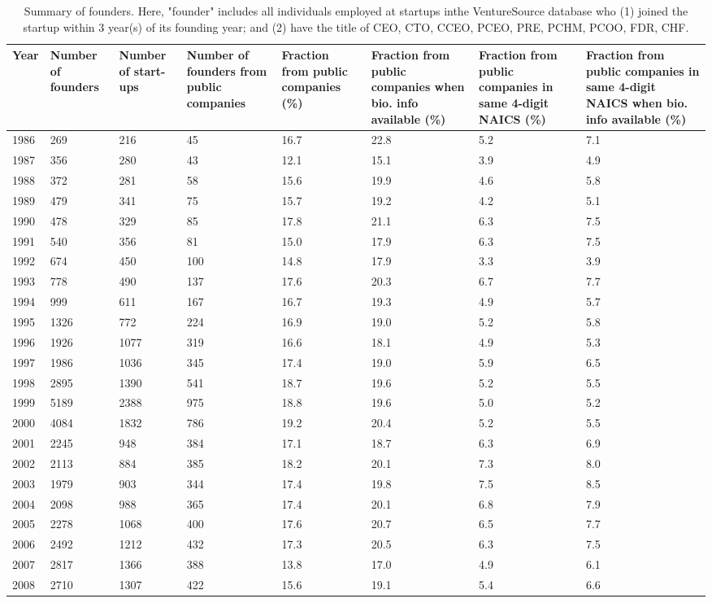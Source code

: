\begin{sidewaystable}[!htb]
\centering
\begingroup\tiny
\begin{tabular}{p{1.75cm}p{1.75cm}p{1.75cm}p{1.75cm}p{1.75cm}p{1.75cm}p{1.75cm}p{1.75cm}}
  \toprule
Year & Number of founders & Number of start-ups & Number of founders from public companies & Fraction from public companies (\%) & Fraction from public companies when bio. info available (\%) & Fraction from public companies in same 4-digit NAICS (\%) & Fraction from public companies in same 4-digit NAICS when bio. info available (\%) \\ 
  \midrule
1986 & 269 & 216 & 45 & 16.7 & 22.8 & 5.2 & 7.1 \\ 
  1987 & 356 & 280 & 43 & 12.1 & 15.1 & 3.9 & 4.9 \\ 
  1988 & 372 & 281 & 58 & 15.6 & 19.9 & 4.6 & 5.8 \\ 
  1989 & 479 & 341 & 75 & 15.7 & 19.2 & 4.2 & 5.1 \\ 
  1990 & 478 & 329 & 85 & 17.8 & 21.1 & 6.3 & 7.5 \\ 
  1991 & 540 & 356 & 81 & 15.0 & 17.9 & 6.3 & 7.5 \\ 
  1992 & 674 & 450 & 100 & 14.8 & 17.9 & 3.3 & 3.9 \\ 
  1993 & 778 & 490 & 137 & 17.6 & 20.3 & 6.7 & 7.7 \\ 
  1994 & 999 & 611 & 167 & 16.7 & 19.3 & 4.9 & 5.7 \\ 
  1995 & 1326 & 772 & 224 & 16.9 & 19.0 & 5.2 & 5.8 \\ 
  1996 & 1926 & 1077 & 319 & 16.6 & 18.1 & 4.9 & 5.3 \\ 
  1997 & 1986 & 1036 & 345 & 17.4 & 19.0 & 5.9 & 6.5 \\ 
  1998 & 2895 & 1390 & 541 & 18.7 & 19.6 & 5.2 & 5.5 \\ 
  1999 & 5189 & 2388 & 975 & 18.8 & 19.6 & 5.0 & 5.2 \\ 
  2000 & 4084 & 1832 & 786 & 19.2 & 20.4 & 5.2 & 5.5 \\ 
  2001 & 2245 & 948 & 384 & 17.1 & 18.7 & 6.3 & 6.9 \\ 
  2002 & 2113 & 884 & 385 & 18.2 & 20.1 & 7.3 & 8.0 \\ 
  2003 & 1979 & 903 & 344 & 17.4 & 19.8 & 7.5 & 8.5 \\ 
  2004 & 2098 & 988 & 365 & 17.4 & 20.1 & 6.8 & 7.9 \\ 
  2005 & 2278 & 1068 & 400 & 17.6 & 20.7 & 6.5 & 7.7 \\ 
  2006 & 2492 & 1212 & 432 & 17.3 & 20.5 & 6.3 & 7.5 \\ 
  2007 & 2817 & 1366 & 388 & 13.8 & 17.0 & 4.9 & 6.1 \\ 
  2008 & 2710 & 1307 & 422 & 15.6 & 19.1 & 5.4 & 6.6 \\ 
   \bottomrule
\end{tabular}
\endgroup
\caption{\scriptsize Summary of founders. Here, "founder" includes all individuals employed at startups inthe VentureSource database who (1) joined the startup within 3 year(s) of its founding year; and (2) have the title of CEO, CTO, CCEO, PCEO, PRE, PCHM, PCOO, FDR, CHF.} 
\label{table:GStable_founder2}
\end{sidewaystable}
